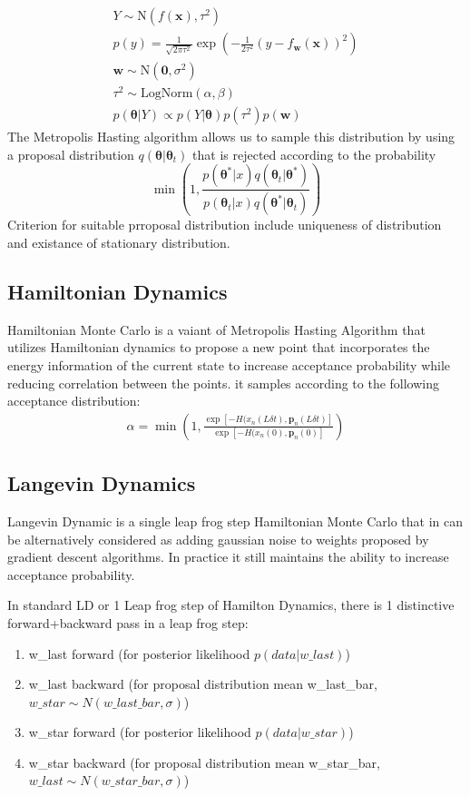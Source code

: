 \documentclass[honours,12pt]{unswthesis}
\numberwithin{equation}{section}
\begin{document}
\begin{gather*} 
    Y \sim \text{N}(f(\bm{x}),\tau^2) \\
    p(y)=\frac{1}{\sqrt{2\pi\tau^2}} \exp(-\frac{1}{2\tau^2} (y-f_{\bm{w}}(\bm{x}))^2) \\ 
    \bm{w} \sim \text{N}(\mathbf{0},\sigma^2) \\ 
    \tau^2 \sim \text{LogNorm}(\alpha,\beta) \\
    p(\bm{\theta}|Y) \propto p(Y|\bm{\theta})p(\tau^2)p(\bm{w})
\end{gather*}
The Metropolis Hasting algorithm allows us to sample this distribution by using a proposal distribution $q(\bm{\theta}|\bm{\theta}_t)$ that is rejected according to the probability 
\begin{equation*}
    \min(1,\frac{p(\bm{\theta}^*|x)q(\bm{\theta}_t|\bm{\theta}^*)}{p(\bm{\theta}_t|x)q(\bm{\theta}^*|\bm{\theta}_t)})
\end{equation*}
Criterion for suitable prroposal distribution include uniqueness of distribution and existance of stationary distribution. 

\subsection{Hamiltonian Dynamics}
Hamiltonian Monte Carlo is a vaiant of Metropolis Hasting Algorithm that utilizes Hamiltonian dynamics to propose a new point that incorporates the energy information of the current state to increase acceptance probability while reducing correlation between the points.
it samples according to the following acceptance distribution:
\begin{gather*}
    \alpha = \min(1,\frac{\exp[-H(x_n (L\delta t),\mathbf{p}_n(L\delta t) ]} {\exp[-H(x_n (0),\mathbf{p}_n(0) ]} )
\end{gather*} 

\subsection{Langevin Dynamics}
Langevin Dynamic is a single leap frog step Hamiltonian Monte Carlo that in can be alternatively considered as adding gaussian noise to weights proposed by gradient descent algorithms. In practice it still maintains the ability to increase acceptance probability. 

In standard LD or 1 Leap frog step of Hamilton Dynamics, there is 1 distinctive forward+backward pass in a leap frog step:

\begin{enumerate}
    \item w\_last forward (for posterior likelihood $p(data|w\_last)$)
    \item w\_last backward (for proposal distribution mean w\_last\_bar,$w\_star \sim N(w\_last\_bar,\sigma)$) 
    \item w\_star forward (for posterior likelihood $p(data|w\_star)$)
    \item w\_star backward (for proposal distribution mean w\_star\_bar,$w\_last \sim N(w\_star\_bar,\sigma)$) 
\end{enumerate}
\end{document}
